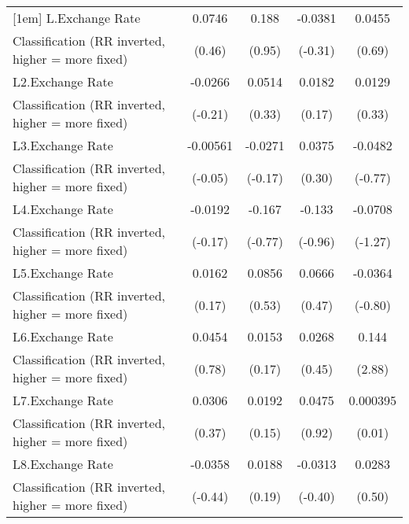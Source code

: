 {\begin{tabular}{l*{4}{c}}
[1em]
L.Exchange Rate     &      0.0746         &       0.188         &     -0.0381         &      0.0455         \\
Classification (RR inverted, higher = more fixed)&      (0.46)         &      (0.95)         &     (-0.31)         &      (0.69)         \\
[1em]
L2.Exchange Rate    &     -0.0266         &      0.0514         &      0.0182         &      0.0129         \\
Classification (RR inverted, higher = more fixed)&     (-0.21)         &      (0.33)         &      (0.17)         &      (0.33)         \\
[1em]
L3.Exchange Rate    &    -0.00561         &     -0.0271         &      0.0375         &     -0.0482         \\
Classification (RR inverted, higher = more fixed)&     (-0.05)         &     (-0.17)         &      (0.30)         &     (-0.77)         \\
[1em]
L4.Exchange Rate    &     -0.0192         &      -0.167         &      -0.133         &     -0.0708         \\
Classification (RR inverted, higher = more fixed)&     (-0.17)         &     (-0.77)         &     (-0.96)         &     (-1.27)         \\
[1em]
L5.Exchange Rate    &      0.0162         &      0.0856         &      0.0666         &     -0.0364         \\
Classification (RR inverted, higher = more fixed)&      (0.17)         &      (0.53)         &      (0.47)         &     (-0.80)         \\
[1em]
L6.Exchange Rate    &      0.0454         &      0.0153         &      0.0268         &       0.144\sym{**} \\
Classification (RR inverted, higher = more fixed)&      (0.78)         &      (0.17)         &      (0.45)         &      (2.88)         \\
[1em]
L7.Exchange Rate    &      0.0306         &      0.0192         &      0.0475         &    0.000395         \\
Classification (RR inverted, higher = more fixed)&      (0.37)         &      (0.15)         &      (0.92)         &      (0.01)         \\
[1em]
L8.Exchange Rate    &     -0.0358         &      0.0188         &     -0.0313         &      0.0283         \\
Classification (RR inverted, higher = more fixed)&     (-0.44)         &      (0.19)         &     (-0.40)         &      (0.50)         \\

\end{tabular}}
